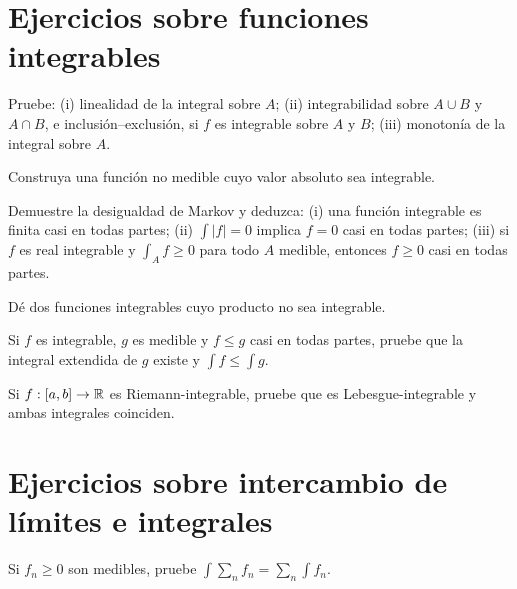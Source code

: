 \section{Ejercicios sobre funciones integrables}
\begin{ejercicio}\label{ej:v2-l09-1}
Pruebe: (i) linealidad de la integral sobre $A$; (ii) integrabilidad sobre $A\cup B$ y $A\cap B$, e inclusión--exclusión, si $f$ es integrable sobre $A$ y $B$; (iii) monotonía de la integral sobre $A$.
\end{ejercicio}

\begin{ejercicio}\label{ej:v2-l09-2}
Construya una función no medible cuyo valor absoluto sea integrable.
\end{ejercicio}

\begin{ejercicio}\label{ej:v2-l09-3}
Demuestre la desigualdad de Markov y deduzca: (i) una función integrable es finita casi en todas partes; (ii) $\int|f|=0$ implica $f=0$ casi en todas partes; (iii) si $f$ es real integrable y $\int_Af\ge0$ para todo $A$ medible, entonces $f\ge0$ casi en todas partes.
\end{ejercicio}

\begin{ejercicio}\label{ej:v2-l09-4}
Dé dos funciones integrables cuyo producto no sea integrable.
\end{ejercicio}

\begin{ejercicio}\label{ej:v2-l09-5}
Si $f$ es integrable, $g$ es medible y $f\le g$ casi en todas partes, pruebe que la integral extendida de $g$ existe y $\int f\le\int g$.
\end{ejercicio}

\begin{ejercicio}\label{ej:v2-l09-6}
Si $f:[a,b]\to\mathbb R$ es Riemann-integrable, pruebe que es Lebesgue-integrable y ambas integrales coinciden.
\end{ejercicio}


\section{Ejercicios sobre intercambio de límites e integrales}
\begin{ejercicio}\label{ej:v2-l10-1}
Si $f_n\ge0$ son medibles, pruebe $\int\sum_nf_n=\sum_n\int f_n$.
\end{ejercicio}

